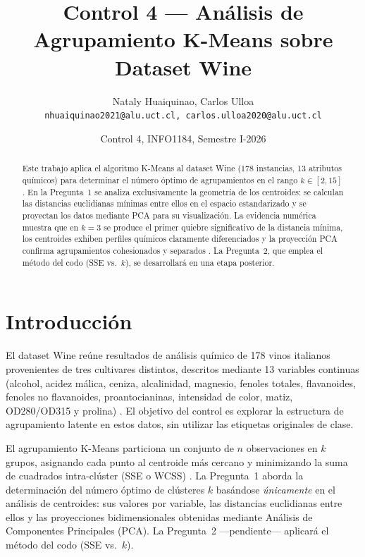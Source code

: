 \documentclass[10pt]{article}
\title{\textbf{Control 4 --- An\'alisis de Agrupamiento K-Means sobre Dataset Wine}}
\author{Nataly Huaiquinao, Carlos Ulloa\\
\texttt{nhuaiquinao2021@alu.uct.cl, carlos.ulloa2020@alu.uct.cl}}
\date{\vspace{-0.6em}Control 4, INFO1184, Semestre I-2026}
\begin{document}
\maketitle
\vspace{-1.0cm}

\begin{abstract}
Este trabajo aplica el algoritmo K-Means al dataset Wine (178 instancias, 13 atributos
qu\'imicos) para determinar el n\'umero \'optimo de agrupamientos en el rango
$k \in [2,15]$ \citep{forina1991wine}.
En la Pregunta~1 se analiza exclusivamente la geometr\'ia de los centroides: se calculan
las distancias euclidianas m\'inimas entre ellos en el espacio estandarizado y se
proyectan los datos mediante PCA para su visualizaci\'on.
La evidencia num\'erica muestra que en $k=3$ se produce el primer quiebre significativo
de la distancia m\'inima, los centroides exhiben perfiles qu\'imicos claramente
diferenciados y la proyecci\'on PCA confirma agrupamientos cohesionados y separados
\citep{james2021introduction}.
La Pregunta~2, que emplea el m\'etodo del codo (SSE vs.\ $k$), se desarrollar\'a
en una etapa posterior.
\end{abstract}

\section{Introducci\'on}

El dataset Wine re\'une resultados de an\'alisis qu\'imico de 178 vinos italianos
provenientes de tres cultivares distintos, descritos mediante 13 variables continuas
(alcohol, acidez m\'alica, ceniza, alcalinidad, magnesio, fenoles totales, flavanoides,
fenoles no flavanoides, proantocianinas, intensidad de color, matiz, OD280/OD315 y
prolina) \citep{forina1991wine}.
El objetivo del control es explorar la estructura de agrupamiento latente en estos datos,
sin utilizar las etiquetas originales de clase.

El agrupamiento K-Means particiona un conjunto de $n$ observaciones en $k$ grupos,
asignando cada punto al centroide m\'as cercano y minimizando la suma de cuadrados
intra-cl\'uster (SSE o WCSS) \citep{james2021introduction}.
La Pregunta~1 aborda la determinaci\'on del n\'umero \'optimo de cl\'usteres $k$
bas\'andose \textit{\'unicamente} en el an\'alisis de centroides: sus valores por
variable, las distancias euclidianas entre ellos y las proyecciones bidimensionales
obtenidas mediante An\'alisis de Componentes Principales (PCA).
La Pregunta~2 ---pendiente--- aplicar\'a el m\'etodo del codo (SSE vs.\ $k$).
\end{document}
